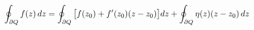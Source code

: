 \documentclass[preview]{standalone}
\begin{document}
\begin{align*}
\special{dvisvgm:raw <g id='unique000'>}\oint_{\partial Q} f(z)\,dz = \oint_{\partial Q}\big[f(z_0)+f'(z_0)(z-z_0)\big] dz + \oint_{\partial Q} \eta(z)(z-z_0)\,dz\special{dvisvgm:raw </g>}
\end{align*}
\end{document}
